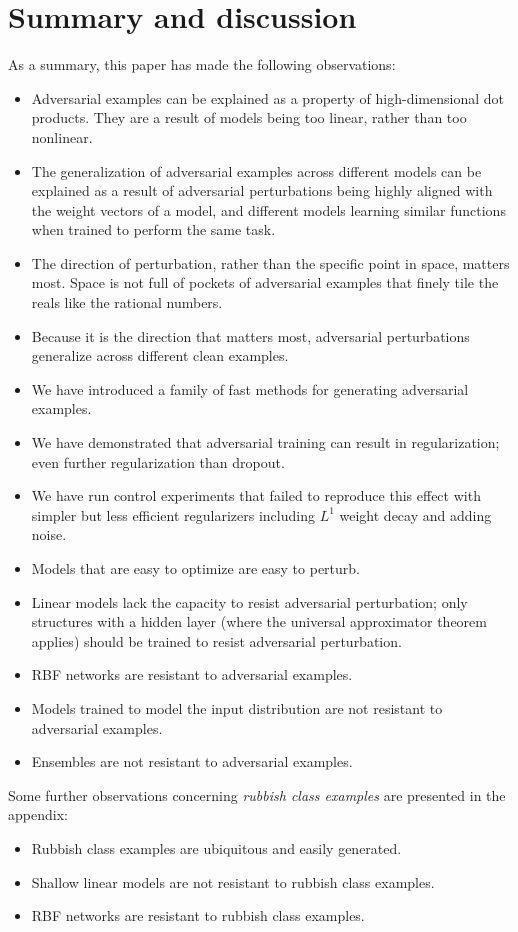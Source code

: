 \documentclass{article} %
\begin{document}
\section{Summary and discussion}
As a summary, this  paper has made the following observations:
\begin{itemize}
\item Adversarial examples can be explained as a property of high-dimensional dot products. They are a result of models being too linear,
rather than too nonlinear.
\item The generalization of adversarial examples across different models can be explained as a result of adversarial perturbations being
highly aligned with the weight vectors of a model, and different models learning similar functions when trained to perform the same task.
\item The direction of perturbation, rather than the specific point in space, matters most. Space is not full of pockets of adversarial examples that finely tile the reals like the rational numbers.
\item Because it is the direction that matters most, adversarial perturbations generalize across different clean examples.
\item We have introduced a family of fast methods for generating adversarial examples.
\item We have demonstrated that adversarial training can result in regularization; even further regularization than
dropout.
\item We have run control experiments that failed to reproduce this effect with simpler but less efficient regularizers including $L^1$ weight
decay and adding noise.
\item Models that are easy to optimize are easy to perturb.
\item Linear models lack the capacity to resist adversarial perturbation; only structures with a hidden layer
(where the universal approximator theorem applies) should
be trained to resist adversarial perturbation.
\item RBF networks are resistant to adversarial examples.
\item Models trained to model the input distribution are not resistant to adversarial examples.
\item Ensembles are not resistant to adversarial examples.
  \end{itemize}
Some further observations concerning {\em rubbish class examples} are presented in the appendix:
\begin{itemize}
\item Rubbish class examples are ubiquitous and easily generated.
\item Shallow linear models are not resistant to rubbish class examples.
\item RBF networks are resistant to rubbish class examples.
\end{itemize}
\end{document}
